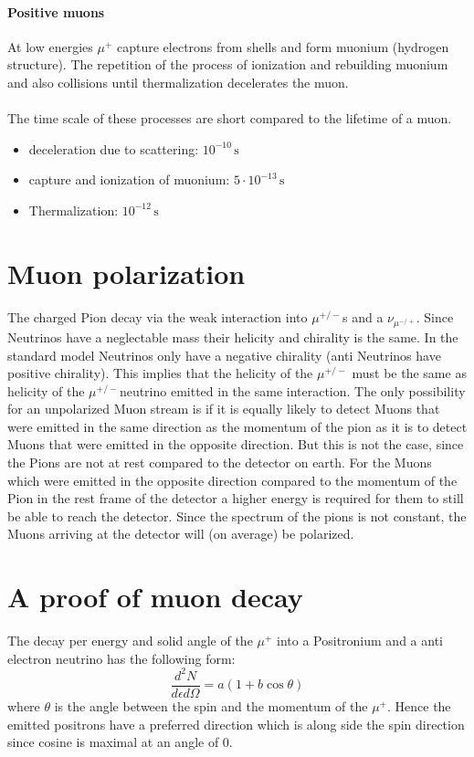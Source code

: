 \paragraph{Positive muons}
At low energies $\mu^+$ capture electrons from shells and form muonium (hydrogen structure). The repetition of the process of ionization and rebuilding muonium and also collisions until thermalization decelerates the muon.\\
\\
The time scale of these processes are short compared to the lifetime of a muon. 
\begin{itemize}
\item deceleration due to scattering: $10^{-10}\, \text{s}$
\item capture and ionization of muonium: $5\cdot 10^{-13}\, \text{s}$
\item Thermalization: $10^{-12}\, \text{s}$
\end{itemize}



\section{Muon polarization}
The charged Pion decay via the weak interaction into $\mu^{+/-}$s and a $\nu_{\mu^{-/+}}$. Since Neutrinos have a neglectable mass their helicity and chirality is the same. In the standard model Neutrinos only have a negative chirality (anti Neutrinos have positive chirality). This implies that the helicity of the $\mu^{+/-}$ must be the same as helicity of the $\mu^{+/-}$neutrino emitted in the same interaction.  
The only possibility for an unpolarized Muon stream is if it is equally likely to detect Muons that were emitted in the same direction as the momentum of the pion as it is to detect Muons that were emitted in the opposite direction. But this is not the case, since the Pions are not at rest compared to the detector on earth. For the Muons which were emitted in the opposite direction compared to the momentum of the Pion in the rest frame of the detector a higher energy is required for them to still be able to reach the detector. Since the spectrum of the pions is not constant, the Muons arriving at the detector will (on average) be polarized. 

\section{A proof of muon decay}
The decay per energy and solid angle of the $\mu^+$ into a Positronium and a anti electron neutrino has the following form:
\begin{equation}
    \frac{d^2N}{d\epsilon d\Omega} = a (1 + b \cos{\theta})
\end{equation}
where $\theta$ is the angle between the spin and the momentum of the $\mu^+$. Hence the emitted positrons have a preferred direction which is along side the spin direction since cosine is maximal at an angle of 0. 
